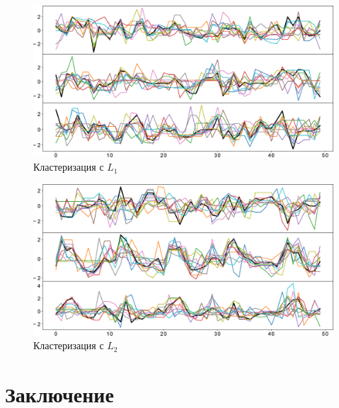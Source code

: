 \documentclass[12pt,twoside]{article}
\begin{document}
    \begin{figure}[h]
        \includegraphics[width=\textwidth]{images/img2.eps}
        \caption{Кластеризация с $L_1$} \label{img1}
    \end{figure}
    \begin{figure}[h!]
        \includegraphics[width=\textwidth]{images/img3.eps}
        \caption{Кластеризация с $L_2$} \label{img2}
    \end{figure}                
    \section{Заключение}

     
    
    
\end{document}
